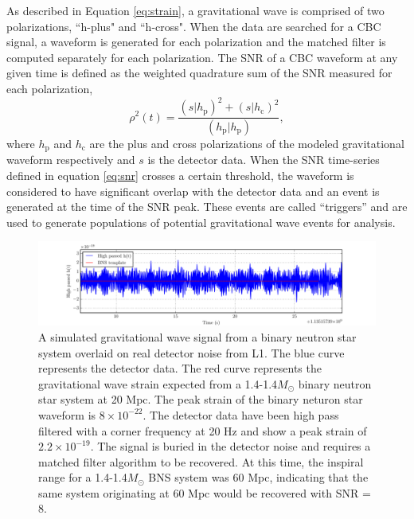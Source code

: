 As described in Equation \ref{eq:strain}, a gravitational wave is comprised of two 
polarizations, ``h-plus" and ``h-cross". When the data are searched for a CBC  
signal, a waveform is generated for each polarization and the matched filter is 
computed separately for each polarization. 
The SNR of a CBC waveform at any given time is defined as the weighted quadrature sum 
of the SNR measured for each polarization, 
\begin{equation}
\rho^2(t) = \frac{(s|h_\mathrm{p})^2 + (s|h_\mathrm{c})^2}{(h_\mathrm{p}|h_\mathrm{p})},
\label{eq:snr}
\end{equation}
where $h_\mathrm{p}$ and $h_\mathrm{c}$ are the plus and cross polarizations of the 
modeled gravitational waveform respectively and $s$ is the detector data. 
When the SNR time-series defined in equation \ref{eq:snr} crosses a certain threshold, 
the waveform is considered to have significant overlap with the detector data and an 
event is generated at the time of the SNR peak. These events are called ``triggers'' 
and are used to generate populations of potential gravitational wave events for analysis.

\begin{figure}[ht!]
\includegraphics[width=\textwidth]{figures/introduction/quiet_BNS}
\caption[BNS signal in detector noise]{A simulated gravitational wave signal from a %
         binary neutron star system overlaid on real detector noise from L1. %
         The blue curve represents the detector data. The red curve represents %
         the gravitational wave strain expected from a 1.4-1.4$M_{\odot}$ %
         binary neutron star system %
         at 20 Mpc. The peak strain of the binary neturon star waveform is %
         $8\times10^{-22}$. %
         The detector data have been high pass filtered with a corner frequency %
         at 20 Hz and show a peak strain of $2.2\times10^{-19}$. The signal is %
         buried in the detector noise and requires a matched filter algorithm %
         to be recovered. At this time, the inspiral range for a 1.4-1.4$M_{\odot}$ %
         BNS system was 60 Mpc, indicating that the same system originating at 60 Mpc %
         would be recovered with SNR = 8. %
         }
\label{fig:quiet-BNS}
\end{figure}

